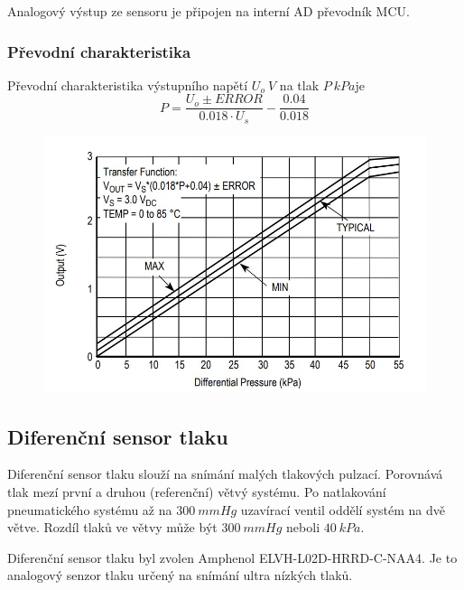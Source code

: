 Analogový výstup ze sensoru je připojen na interní AD převodník MCU. 

\subsubsection{Převodní charakteristika}
Převodní charakteristika výstupního napětí $U_{o} \ V$ na tlak $P \ kPa$je 
\begin{equation}
    P = \frac{U_o \pm ERROR}{0.018 \cdot U_s} - \frac{0.04}{0.018}
    \label{eq:nxp_transfer}
\end{equation}

\begin{figure}[H]
    \centering
    \includegraphics{pictures/nxp_transfer.jpg}
    \caption{}
    \label{fig:nxp_transfer}
\end{figure}




\subsection{Diferenční sensor tlaku}
Diferenční sensor tlaku slouží na snímání malých tlakových pulzací. Porovnává tlak mezí první a druhou (referenční) větvý systému. Po natlakování pneumatického systému až na $300 \ mmHg$ uzavírací ventil oddělí systém na dvě větve. Rozdíl tlaků ve větvy může být $300 \ mmHg$ neboli $40 \ kPa$. \par

Diferenční sensor tlaku byl zvolen Amphenol ELVH-L02D-HRRD-C-NAA4. Je to analogový senzor tlaku určený na snímání ultra nízkých tlaků. 


